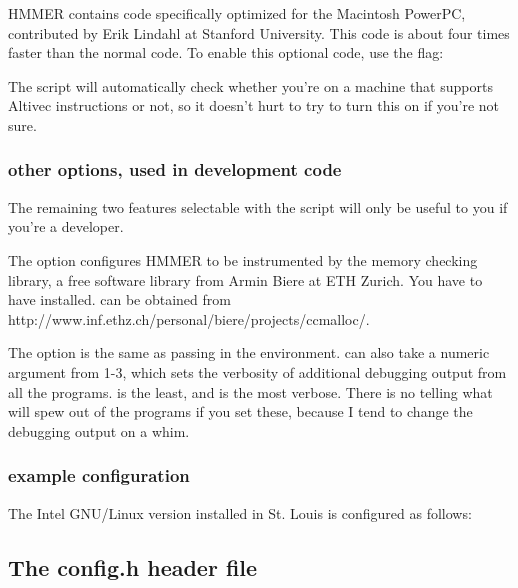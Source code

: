 HMMER contains code specifically optimized for the Macintosh PowerPC,
contributed by Erik Lindahl at Stanford University. This code is about
four times faster than the normal code. To enable this optional code,
use the  flag:


The  script will automatically check whether you're on
a machine that supports Altivec instructions or not, so it doesn't
hurt to try to turn this on if you're not sure.

\subsubsection{other options, used in development code}

The remaining two features selectable with the  script
will only be useful to you if you're a developer.

The  option configures HMMER to be
instrumented by the  memory checking library, a free
software library from Armin Biere at ETH Zurich.  You have to have
 installed.   can be obtained from
{http://www.inf.ethz.ch/personal/biere/projects/ccmalloc/}.

The  option is the same as passing
 in the environment.  can
also take a numeric argument from 1-3, which sets the verbosity of
additional debugging output from all the
programs.  is the least, and
 is the most verbose. There is no telling
what will spew out of the programs if you set these, because I tend to
change the debugging output on a whim.

\subsubsection{example configuration}

The Intel GNU/Linux version installed in St. Louis is configured as
follows:


\subsection{The config.h header file}


